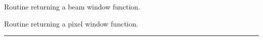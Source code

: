 \begin{related}
  \begin{sulist}{} %
  \item[\htmlref{generate\_beam}{sub:generate_beam}] Routine returning a beam
  window function.
  \item[\htmlref{pixel\_window}{sub:pixel_window}] Routine returning a pixel
  window function.
  \end{sulist}
\end{related}

\rule{\hsize}{2mm}

\newpage
